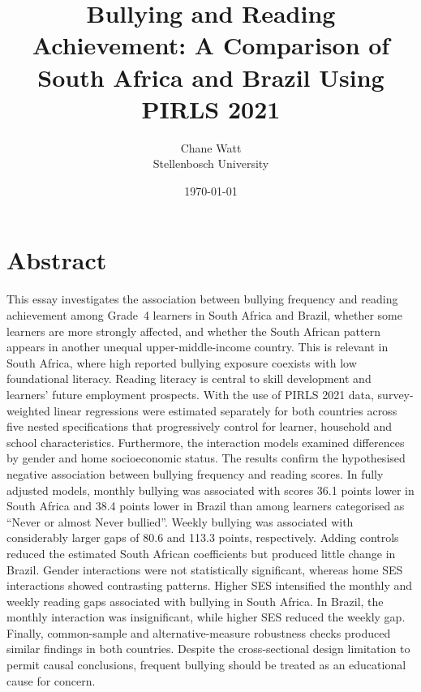 \documentclass[11pt,a4paper]{article}
\title{Bullying and Reading Achievement: A Comparison of South Africa and Brazil Using PIRLS 2021}
\author{Chane Watt \\ Stellenbosch University}
\date{\today}
\begin{document}
\maketitle

\section*{Abstract}
This essay investigates the association between bullying frequency and reading achievement among Grade~4 learners in South Africa and Brazil, whether some learners are more strongly affected, and whether the South African pattern appears in another unequal upper-middle-income country. This is relevant in South Africa, where high reported bullying exposure coexists with low foundational literacy. Reading literacy is central to skill development and learners’ future employment prospects. With the use of PIRLS 2021 data, survey-weighted linear regressions were estimated separately for both countries across five nested specifications that progressively control for learner, household and school characteristics. Furthermore, the interaction models examined differences by gender and home socioeconomic status. The results confirm the hypothesised negative association between bullying frequency and reading scores. In fully adjusted models, monthly bullying was associated with scores 36.1 points lower in South Africa and 38.4 points lower in Brazil than among learners categorised as ``Never or almost Never bullied''. Weekly bullying was associated with considerably larger gaps of 80.6 and 113.3 points, respectively. Adding controls reduced the estimated South African coefficients but produced little change in Brazil. Gender interactions were not statistically significant, whereas home SES interactions showed contrasting patterns. Higher SES intensified the monthly and weekly reading gaps associated with bullying in South Africa. In Brazil, the monthly interaction was insignificant, while higher SES reduced the weekly gap. Finally, common-sample and alternative-measure robustness checks produced similar findings in both countries. Despite the cross-sectional design limitation to permit causal conclusions, frequent bullying should be treated as an educational cause for concern.













\clearpage



\clearpage

\end{document}
